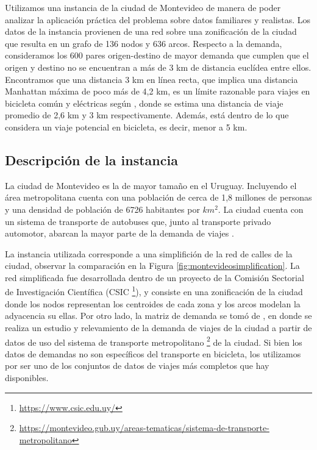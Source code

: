 Utilizamos una instancia de la ciudad de Montevideo de manera de poder analizar la aplicación práctica del problema sobre datos familiares y realistas. Los datos de la instancia provienen de una red sobre una zonificación de la ciudad que resulta en un grafo de 136 nodos y 636 arcos. Respecto a la demanda, consideramos los 600 pares origen-destino de mayor demanda que cumplen que el origen y destino no se encuentran a más de 3 km de distancia euclídea entre ellos. Encontramos que una distancia 3 km en línea recta, que implica una distancia Manhattan máxima de poco más de 4,2 km, es un límite razonable para viajes en bicicleta común y eléctricas según \cite{anette2018}, donde se estima una distancia de viaje promedio de 2,6 km y 3 km respectivamente. Además, está dentro de lo que \cite{shwe2014} considera un viaje potencial en bicicleta, es decir, menor a 5 km.

\subsection{Descripción de la instancia}

La ciudad de Montevideo es la de mayor tamaño en el Uruguay. Incluyendo el área metropolitana cuenta con una población de cerca de 1,8 millones de personas y una densidad de población de 6726 habitantes por $km^2$. La ciudad cuenta con un sistema de transporte de autobuses que, junto al transporte privado automotor, abarcan la mayor parte de la demanda de viajes \parencite{Mauttone2017a}.

La instancia utilizada corresponde a una simplifición de la red de calles de la ciudad, observar la comparación en la Figura \ref{fig:montevideosimplification}. La red simplificada fue desarrollada dentro de un proyecto de la Comisión Sectorial de Investigación Científica (CSIC \footnote{\url{https://www.csic.edu.uy/}}), y consiste en una zonificación de la ciudad donde los nodos representan los centroides de cada zona y los arcos modelan la adyacencia su ellas. Por otro lado, la matriz de demanda se tomó de \cite{Massobrio2020}, en donde se realiza un estudio y relevamiento de la demanda de viajes de la ciudad a partir de datos de uso del sistema de transporte metropolitano \footnote{\url{https://montevideo.gub.uy/areas-tematicas/sistema-de-transporte-metropolitano}} de la ciudad. Si bien los datos de demandas no son específicos del transporte en bicicleta, los utilizamos por ser uno de los conjuntos de datos de viajes más completos que hay disponibles.

